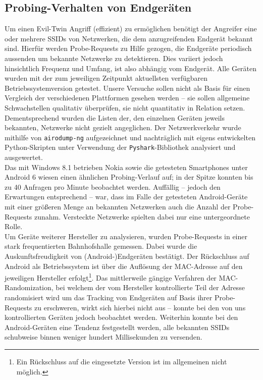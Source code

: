 

\subsection{Probing-Verhalten von Endgeräten}\label{subs:praxisprobes}
Um einen Evil-Twin Angriff (effizient) zu ermöglichen benötigt der Angreifer eine oder mehrere SSIDs von Netzwerken, die dem anzugreifenden Endgerät bekannt sind.
Hierfür werden Probe-Requests zu Hilfe gezogen, die Endgeräte periodisch aussenden um bekannte Netzwerke zu detektieren.
Dies variiert jedoch hinsichtlich Frequenz und Umfang, ist also abhängig vom Endgerät.
Alle Geräten wurden mit der zum jeweiligen Zeitpunkt aktuellsten verfügbaren Betriebssystemversion getestet. Unsere Versuche sollen nicht als Basis für einen Vergleich der verschiedenen Plattformen gesehen werden -- sie sollen allgemeine Schwachstellen qualitativ überprüfen, sie nicht quantitativ in Relation setzen. Dementsprechend wurden die Listen der, den einzelnen Geräten jeweils bekannten, Netzwerke nicht gezielt angeglichen. Der Netzwerkverkehr wurde mithilfe von \texttt{airodump-ng} aufgezeichnet und nachträglich mit eigens entwickelten Python-Skripten unter Verwendung der \texttt{Pyshark}-Bibliothek analysiert und ausgewertet.\\

Das mit Windows 8.1 betrieben Nokia sowie die getesteten Smartphones unter Android 6 wiesen einen ähnlichen Probing-Verlauf auf; in der Spitze konnten bis zu 40 Anfragen pro Minute beobachtet werden.
Auffällig -- jedoch den Erwartungen entsprechend -- war, dass im Falle der getesteten Android-Geräte mit einer größeren Menge an bekannten Netzwerken auch die Anzahl der Probe-Requests zunahm. Versteckte Netzwerke spielten dabei nur eine untergeordnete Rolle.\\

Um Geräte weiterer Hersteller zu analysieren, wurden Probe-Requests in einer stark frequentierten Bahnhofshalle gemessen. Dabei wurde die Auskunftsfreudigkeit von (Android-)Endgeräten bestätigt. Der Rückschluss auf Android als Betriebssystem ist über die Auflösung der MAC-Adresse auf den jeweiligen Hersteller erfolgt\footnote{Ein Rückschluss auf die eingesetzte Version ist im allgemeinen nicht möglich.}.
Das mittlerweile gängige Verfahren der MAC-Randomization, bei welchem der vom Hersteller kontrollierte Teil der Adresse randomisiert wird um das Tracking von Endgeräten auf Basis ihrer Probe-Requests zu erschweren, wirkt sich hierbei nicht aus -- konnte bei den von uns kontrollierten Geräten jedoch beobachtet werden.
Weiterhin konnte bei den Android-Geräten eine Tendenz festgestellt werden, alle bekannten SSIDs schubweise binnen weniger hundert Millisekunden zu versenden.\\


